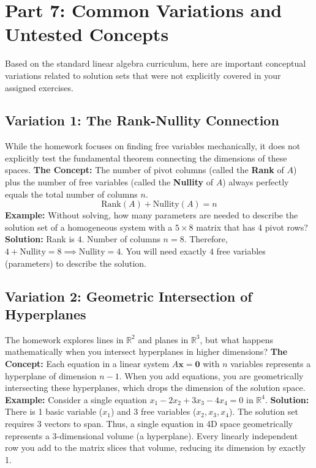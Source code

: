 \documentclass[11pt]{article}
\begin{document}
\newpage
\section{Part 7: Common Variations and Untested Concepts}

Based on the standard linear algebra curriculum, here are important conceptual variations related to solution sets that were not explicitly covered in your assigned exercises.

\subsection{Variation 1: The Rank-Nullity Connection}
While the homework focuses on finding free variables mechanically, it does not explicitly test the fundamental theorem connecting the dimensions of these spaces. 
\textbf{The Concept:} The number of pivot columns (called the \textbf{Rank} of $A$) plus the number of free variables (called the \textbf{Nullity} of $A$) always perfectly equals the total number of columns $n$.
\[ \text{Rank}(A) + \text{Nullity}(A) = n \]
\textbf{Example:} Without solving, how many parameters are needed to describe the solution set of a homogeneous system with a $5 \times 8$ matrix that has 4 pivot rows?
\textbf{Solution:} Rank is $4$. Number of columns $n = 8$. Therefore, $4 + \text{Nullity} = 8 \implies \text{Nullity} = 4$. You will need exactly $4$ free variables (parameters) to describe the solution.

\subsection{Variation 2: Geometric Intersection of Hyperplanes}
The homework explores lines in $\mathbb{R}^2$ and planes in $\mathbb{R}^3$, but what happens mathematically when you intersect hyperplanes in higher dimensions?
\textbf{The Concept:} Each equation in a linear system $A\mathbf{x} = \mathbf{0}$ with $n$ variables represents a hyperplane of dimension $n-1$. When you add equations, you are geometrically intersecting these hyperplanes, which drops the dimension of the solution space. 
\textbf{Example:} Consider a single equation $x_1 - 2x_2 + 3x_3 - 4x_4 = 0$ in $\mathbb{R}^4$.
\textbf{Solution:} There is 1 basic variable ($x_1$) and 3 free variables ($x_2, x_3, x_4$). The solution set requires 3 vectors to span. Thus, a single equation in 4D space geometrically represents a 3-dimensional volume (a hyperplane). Every linearly independent row you add to the matrix slices that volume, reducing its dimension by exactly 1.
\end{document}
